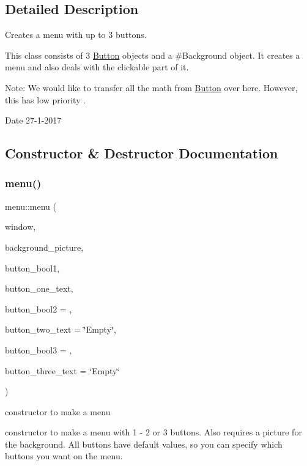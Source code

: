 \subsection{Detailed Description}
Creates a menu with up to 3 buttons. 

This class consists of 3 \hyperlink{class_button}{Button} objects and a \#\+Background object. It creates a menu and also deals with the clickable part of it.

Note\+: We would like to transfer all the math from \hyperlink{class_button}{Button} over here. However, this has low priority .

\begin{DoxyDate}{Date}
27-\/1-\/2017 
\end{DoxyDate}


\subsection{Constructor \& Destructor Documentation}
\mbox{\label{classmenu_a1c6f1319ba2123f9654df695725e83b4}} 
\subsubsection{\texorpdfstring{menu()}{menu()}}
{\footnotesize\ttfamily menu\+::menu (\begin{DoxyParamCaption}\item[{sf\+::\+Render\+Window \&}]{window,  }\item[{std\+::string}]{background\+\_\+picture,  }\item[{bool}]{button\+\_\+bool1,  }\item[{std\+::string}]{button\+\_\+one\+\_\+text,  }\item[{bool}]{button\+\_\+bool2 = {},  }\item[{std\+::string}]{button\+\_\+two\+\_\+text = {\ttfamily \char`\"{}Empty\char`\"{}},  }\item[{bool}]{button\+\_\+bool3 = {},  }\item[{std\+::string}]{button\+\_\+three\+\_\+text = {\ttfamily \char`\"{}Empty\char`\"{}} }\end{DoxyParamCaption})}



constructor to make a menu 

constructor to make a menu with 1 -\/ 2 or 3 buttons. Also requires a picture for the background. All buttons have default values, so you can specify which buttons you want on the menu.


